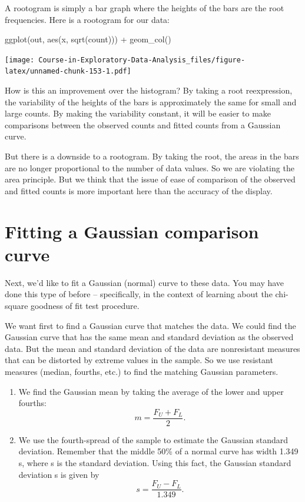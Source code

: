 \documentclass[
]{book}
\newenvironment{Shaded}{\begin{snugshade}}{\end{snugshade}}
\newcommand{\FunctionTok}[1]{\textcolor[rgb]{0.00,0.00,0.00}{#1}}
\newcommand{\NormalTok}[1]{#1}
\newcommand{\SpecialCharTok}[1]{\textcolor[rgb]{0.00,0.00,0.00}{#1}}
\begin{document}
A rootogram is simply a bar graph where the heights of the bars are the root frequencies. Here is a rootogram for our data:

\begin{Shaded}
\begin{Highlighting}[]
\FunctionTok{ggplot}\NormalTok{(out, }\FunctionTok{aes}\NormalTok{(x, }\FunctionTok{sqrt}\NormalTok{(count))) }\SpecialCharTok{+}
  \FunctionTok{geom\_col}\NormalTok{()}
\end{Highlighting}
\end{Shaded}

\texttt{[image: Course-in-Exploratory-Data-Analysis\_files/figure-latex/unnamed-chunk-153-1.pdf]}

How is this an improvement over the histogram? By taking a root reexpression, the variability of the heights of the bars is approximately the same for small and large counts. By making the variability constant, it will be easier to make comparisons between the observed counts and fitted counts from a Gaussian curve.

But there is a downside to a rootogram. By taking the root, the areas in the bars are no longer proportional to the number of data values. So we are violating the area principle. But we think that the issue of ease of comparison of the observed and fitted counts is more important here than the accuracy of the display.

\hypertarget{fitting-a-gaussian-comparison-curve}{%
\section{Fitting a Gaussian comparison curve}\label{fitting-a-gaussian-comparison-curve}}

Next, we'd like to fit a Gaussian (normal) curve to these data. You may have done this type of before -- specifically, in the context of learning about the chi-square goodness of fit test procedure.

We want first to find a Gaussian curve that matches the data. We could find the Gaussian curve that has the same mean and standard deviation as the observed data. But the mean and standard deviation of the data are nonresistant measures that can be distorted by extreme values in the sample. So we use resistant measures (median, fourths, etc.) to find the matching Gaussian parameters.

\begin{enumerate}
\def\labelenumi{\arabic{enumi}.}
\item
  We find the Gaussian mean by taking the average of the lower and upper fourths:
  \[
  m = \frac{F_U + F_L}{2}.
  \]
\item
  We use the fourth-spread of the sample to estimate the Gaussian standard deviation. Remember that the middle 50\% of a normal curve has width 1.349 s, where s is the standard deviation. Using this fact, the Gaussian standard deviation s is given by
  \[
  s = \frac{F_U - F_L}{1.349}.
  \]
\end{enumerate}
\end{document}
